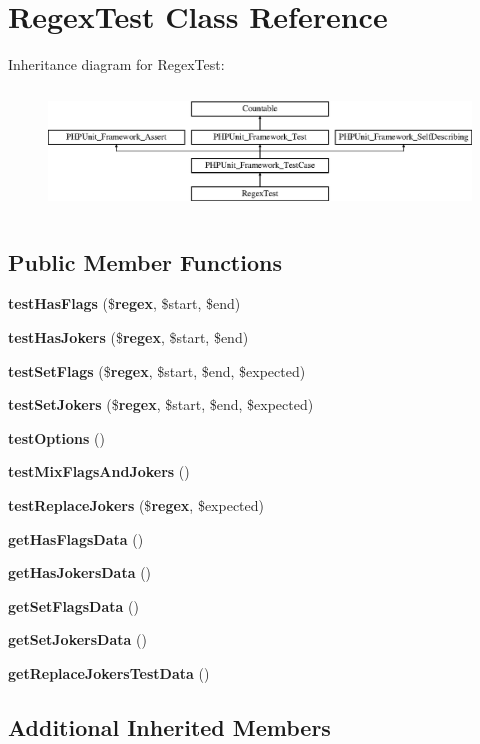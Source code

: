 \section{Regex\+Test Class Reference}
\label{class_symfony_1_1_component_1_1_finder_1_1_tests_1_1_expression_1_1_regex_test}
Inheritance diagram for Regex\+Test\+:\begin{figure}[H]
\begin{center}
\leavevmode
\includegraphics[height=3.303835cm]{class_symfony_1_1_component_1_1_finder_1_1_tests_1_1_expression_1_1_regex_test}
\end{center}
\end{figure}
\subsection*{Public Member Functions}
\begin{DoxyCompactItemize}
\item 
{\bf test\+Has\+Flags} (\${\bf regex}, \$start, \$end)
\item 
{\bf test\+Has\+Jokers} (\${\bf regex}, \$start, \$end)
\item 
{\bf test\+Set\+Flags} (\${\bf regex}, \$start, \$end, \$expected)
\item 
{\bf test\+Set\+Jokers} (\${\bf regex}, \$start, \$end, \$expected)
\item 
{\bf test\+Options} ()
\item 
{\bf test\+Mix\+Flags\+And\+Jokers} ()
\item 
{\bf test\+Replace\+Jokers} (\${\bf regex}, \$expected)
\item 
{\bf get\+Has\+Flags\+Data} ()
\item 
{\bf get\+Has\+Jokers\+Data} ()
\item 
{\bf get\+Set\+Flags\+Data} ()
\item 
{\bf get\+Set\+Jokers\+Data} ()
\item 
{\bf get\+Replace\+Jokers\+Test\+Data} ()
\end{DoxyCompactItemize}
\subsection*{Additional Inherited Members}


